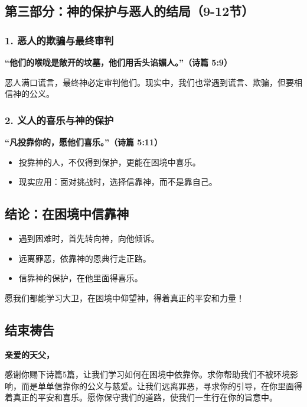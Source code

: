 \documentclass[a4paper, 12pt]{article}
\begin{document}
\subsection*{第三部分：神的保护与恶人的结局（9-12节）}

\subsubsection*{1. 恶人的欺骗与最终审判}
\textbf{“他们的喉咙是敞开的坟墓，他们用舌头谄媚人。”（诗篇 5:9）}

恶人满口谎言，最终神必定审判他们。现实中，我们也常遇到谎言、欺骗，但要相信神的公义。

\subsubsection*{2. 义人的喜乐与神的保护}
\textbf{“凡投靠你的，愿他们喜乐。”（诗篇 5:11）}

\begin{itemize}
    \item 投靠神的人，不仅得到保护，更能在困境中喜乐。
    \item 现实应用：面对挑战时，选择信靠神，而不是靠自己。
\end{itemize}

\subsection*{结论：在困境中信靠神}

\begin{itemize}
    \item 遇到困难时，首先转向神，向他倾诉。
    \item 远离罪恶，依靠神的恩典行走正路。
    \item 信靠神的保护，在他里面得喜乐。
\end{itemize}

愿我们都能学习大卫，在困境中仰望神，得着真正的平安和力量！

\subsection*{结束祷告}

\textbf{亲爱的天父，}

感谢你赐下诗篇5篇，让我们学习如何在困境中依靠你。求你帮助我们不被环境影响，而是单单信靠你的公义与慈爱。让我们远离罪恶，寻求你的引导，在你里面得着真正的平安和喜乐。愿你保守我们的道路，使我们一生行在你的旨意中。
\end{document}
